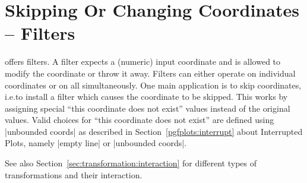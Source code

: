 
\section{Skipping Or Changing Coordinates -- Filters}
\label{sec:filters}

\PGFPlots{} offers filters. A filter expects a (numeric) input coordinate and
is allowed to modify the coordinate or throw it away. Filters can either
operate on individual coordinates or on all simultaneously. One main
application is to skip coordinates, i.e.\@ to install a filter which causes the
coordinate to be skipped. This works by assigning special ``this coordinate
does not exist'' values instead of the original values. Valid choices for
``this coordinate does not exist'' are defined using |unbounded coords| as
described in Section~\ref{pgfplots:interrupt} about Interrupted Plots, namely
|empty line| or |unbounded coords|.

See also Section~\ref{sec:transformation:interaction} for different types of
transformations and their interaction.

